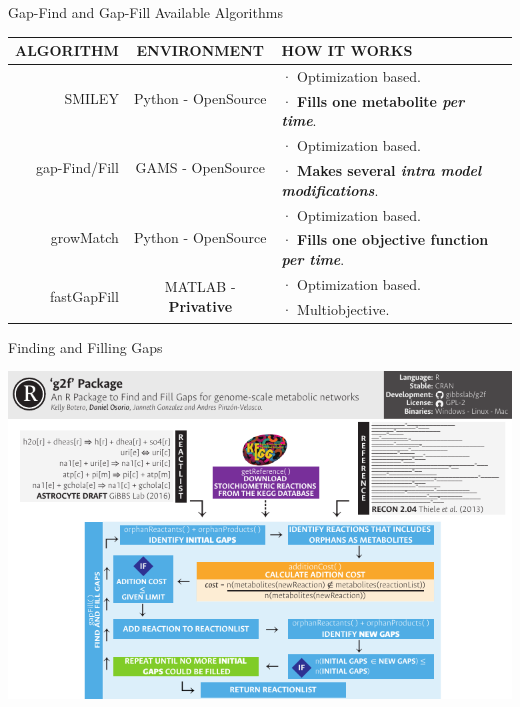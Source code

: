 \documentclass[11pt]{beamer}
\begin{document}
\begin{frame}{Gap-Find and Gap-Fill Available Algorithms}
\begin{center}
\begin{tabular}{r|c|p{3.7cm}}
\hline
\textbf{ALGORITHM}&\textbf{ENVIRONMENT}&\textbf{HOW IT WORKS}\\
\hline
\hline
\multirow{2}{*}{SMILEY}&\multirow{2}{*}{Python - OpenSource}&· Optimization based.\\
&&· \textbf{Fills one metabolite \emph{per time}}.\\
\hline
\multirow{2}{*}{gap-Find/Fill}&\multirow{2}{*}{GAMS - OpenSource}&· Optimization based.\\
&&· \textbf{Makes several \emph{intra model modifications}}.\\
\hline
\multirow{2}{*}{growMatch}&\multirow{2}{*}{Python - OpenSource}&· Optimization based.\\
&&· \textbf{Fills one objective function \emph{per time}}.\\
\hline
\multirow{2}{*}{fastGapFill}&\multirow{2}{*}{MATLAB - \textbf{Privative}}&· Optimization based.\\
&&· Multiobjective.\\
\hline
\end{tabular}
\end{center}
\end{frame}
\begin{frame}{Finding and Filling Gaps}
\begin{center}
\includegraphics[width=\textwidth]{g2f}
\end{center}
\end{frame}
\end{document}
